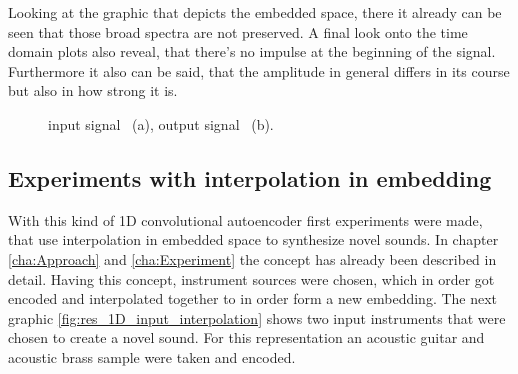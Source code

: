 Looking at the graphic that depicts the embedded space, there it already can be seen that those broad spectra are not preserved. A final look onto the time domain plots also reveal, that there's no impulse at the beginning of the signal. Furthermore it also can be said, that the amplitude in general differs in its course but also in how strong it is.

\begin{figure}[htb!]
    \centering
    \caption{input signal ~(a), output signal ~(b).}
    \label{fig:res_1D_input_output_sig}
\end{figure}


\subsection{Experiments with interpolation in embedding}
With this kind of 1D convolutional autoencoder first experiments were made, that use interpolation in embedded space to synthesize novel sounds. In chapter \ref{cha:Approach} and \ref{cha:Experiment} the concept has already been described in detail. Having this concept, instrument sources were chosen, which in order got encoded and interpolated together to in order form a new embedding. The next graphic \ref{fig:res_1D_input_interpolation} shows two input instruments that were chosen to create a novel sound. For this representation an acoustic guitar and acoustic brass sample were taken and encoded.

